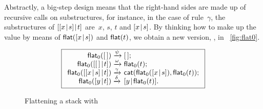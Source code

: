 Abstractly, a big\hyp{}step design means that the right\hyp{}hand
sides are made up of recursive calls on substructures, for instance,
in the case of rule~\(\gamma\), the substructures of
\([{[{x}\!\mid\!{s}]}\!\mid\!{t}]\) are~\(x\), \(s\), \(t\) and
\([{x}\!\mid\!{s}]\). By thinking how to make up the value by means of
\(\textsf{flat}([{x}\!\mid\!{s}])\) and
\(\textsf{flat}(t)\), we obtain a new version,
, in
\fig~\vref{fig:flat0}.
\begin{figure}
\begin{equation*}
\boxed{%
\begin{array}{r@{\;}l@{\;}l}
\fun{flat}_0(\el)                   & \xrightarrow{\smash{\psi}}
                                    & \el;\\
\fun{flat}_0(\cons{\el}{t})         & \xrightarrow{\smash{\omega}}
                                    & \fun{flat}_0(t);\\
\fun{flat}_0(\cons{\cons{x}{s}}{t}) & \xrightarrow{\smash{\gamma}}
        & \fun{cat}(\fun{flat}_0(\cons{x}{s}),\fun{flat}_0(t));\\
\fun{flat}_0(\cons{y}{t})           & \xrightarrow{\smash{\delta}}
                                    & \cons{y}{\fun{flat}_0(t)}.
\end{array}}
\end{equation*}
\caption{Flattening a stack with }
\label{fig:flat0}
\end{figure}

